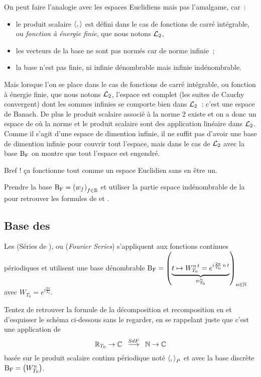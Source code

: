 
 On peut faire
l'analogie avec les espaces Euclidiens mais pas l'amalgame, car~:
\begin{itemize}
\item le produit scalaire $\langle,\rangle$ est défini  dans le cas de fonctions de carré
intégrable, ou \emph{fonction à énergie finie}, que nous notons $\mathcal{L}_{2}$,
\item les vecteurs de la base ne sont pas normés car de norme infinie~;
\item la base n'est pas finie, ni infinie dénombrable mais infinie indénombrable.
\end{itemize}

Mais lorsque l'on se place dans le cas de fonctions de carré
intégrable, ou fonction à énergie finie, que nous notons $\mathcal{L}_{2}$,
l'espace est complet (les suites de Cauchy convergent) dont les sommes
infinies se comporte bien dans $\mathcal{L}_{2}$~: c'est une espace de
Banach. De plus le produit scalaire associé à la norme 2 existe et on
a donc un espace de \Hilbert{} où la norme et le produit scalaire sont
des application linéaire dans $\mathcal{L}_{2}$. Comme il s'agit d'une espace
de dimention infinie, il ne suffit pas d'avoir une base de dimention
infinie pour couvrir tout l'espace, mais dans le cas de $\mathcal{L}_{2}$ avec
la base $\mathrm{B_F}$ on montre que tout l'espace est engendré.

Bref ! ça fonctionne tout comme un espace Euclidien sans en être un.

\begin{exercice}
Prendre la base $\mathrm{B_F}=\left(w_f\right)_{f\in\mathbb{R}}$ et utiliser la partie espace indénombrable de la  pour retrouver les formules de \Plancherel{} et \Parseval{}. 
\end{exercice}


\subsection{Base des \sdf{}}
Les \sdf{} (Séries de \Fourier{}), ou \FS{} (\emph{Fourier Series}) s'appliquent aux fonctions continues périodiques et   utilisent une base dénombrable $\mathrm{B_F}=\left(\underbrace{t\mapsto W_{T_0}^{n\,t}=e^{i \frac{2 \pi}{T_0}\,n\,t}}_{w_{T_0}^n}\right)_{n\in\mathbb{N}}$ avec $W_{T_0}=e^{i \frac{2 \pi}{T_0}}$.
\begin{exercice}
Tentez de retrouver la formule de la décomposition et recomposition en \sdf{} et d'esquisser le schéma ci-dessous sans le regarder, en se rappelant juste que c'est une application de $$\RT0\rightarrow\C\;\;\operateur{\sdf}\;\;\N\rightarrow\C$$  basée sur le produit scalaire continu périodique noté $\langle,{\rangle}_P$ et avec la base discrète $\mathrm{B_F}=\left(W_{T_0}^n\right)$.
\end{exercice}

